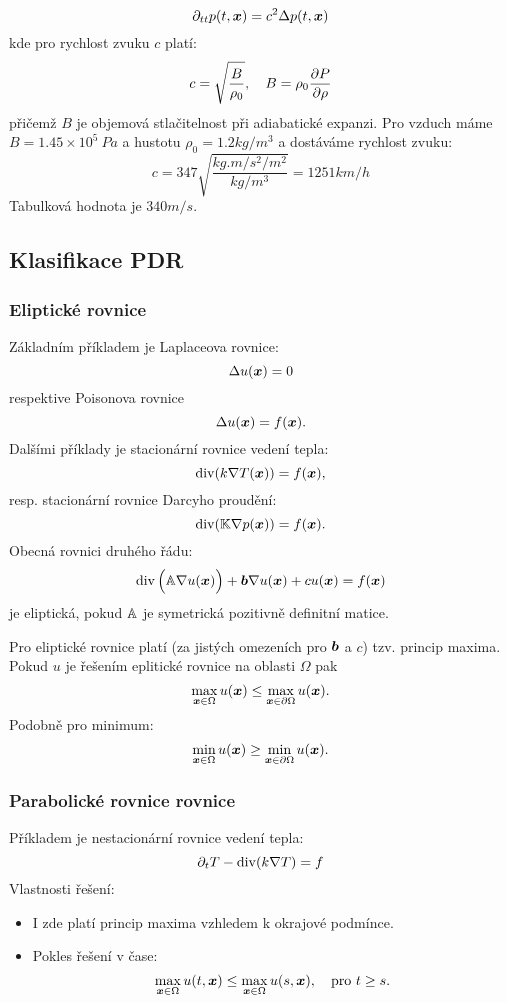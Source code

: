 \[
    \partial_{tt} p(t, \mathbf{\boldsymbol{x}}) = c^2 \Delta p(t, \mathbf{\boldsymbol{x}})
\]
kde pro rychlost zvuku $c$ platí:
\[
    c = \sqrt{\frac{B}{\rho_0}},\quad B = \rho_0 \frac{\partial P}{\partial \rho}
\]
přičemž $B$ je objemová stlačitelnost při adiabatické expanzi. Pro vzduch máme $B=1.45\times 10^5\ Pa$ a hustotu $\rho_0 = 1.2kg/m^3$ a dostáváme rychlost zvuku:
\[
    c=347 \sqrt{\frac{kg.m/s^2/m^2}{kg/m^3}} = 1251 km/h
\]
Tabulková hodnota je $340m/s$.









\subsection{Klasifikace PDR}

\subsubsection{Eliptické rovnice}
Základním příkladem je Laplaceova rovnice:
\[
    \Delta u(\mathbf{\boldsymbol{x}}) = 0
\]
respektive Poisonova rovnice
\[
    \Delta u(\mathbf{\boldsymbol{x}}) = f(\mathbf{\boldsymbol{x}}).
\]
Dalšími příklady je stacionární rovnice vedení tepla:
\[
    \operatorname{div}( k \nabla T(\mathbf{\boldsymbol{x}}) ) = f(\mathbf{\boldsymbol{x}}),
\]
resp. stacionární rovnice Darcyho proudění:
\[
    \operatorname{div}( {\mathbb{K}} \nabla p(\mathbf{\boldsymbol{x}})) = f(\mathbf{\boldsymbol{x}}).
\]
Obecná rovnici druhého řádu:
\[
  \operatorname{div}\Big( {\mathbb{A}} \nabla u(\mathbf{\boldsymbol{x}})\Big) + \mathbf{\boldsymbol{b}} \nabla u(\mathbf{\boldsymbol{x}}) + c u(\mathbf{\boldsymbol{x}})= f(\mathbf{\boldsymbol{x}})
\]
je eliptická, pokud ${\mathbb{A}}$ je symetrická pozitivně definitní matice.

Pro eliptické rovnice platí (za jistých omezeních pro $\mathbf{\boldsymbol{b}}$ a $c$) tzv. princip maxima. Pokud $u$ je řešením eplitické rovnice na oblasti $\Omega$
pak 
\[
    \max_{\mathbf{\boldsymbol{x}} \in \Omega} u(\mathbf{\boldsymbol{x}}) \le \max_{\mathbf{\boldsymbol{x}} \in \partial \Omega}  u(\mathbf{\boldsymbol{x}}).
\]
Podobně pro minimum:
\[
    \min_{\mathbf{\boldsymbol{x}} \in \Omega} u(\mathbf{\boldsymbol{x}}) \ge \min_{\mathbf{\boldsymbol{x}} \in \partial \Omega}  u(\mathbf{\boldsymbol{x}}).
\]


\subsubsection{Parabolické rovnice rovnice}
Příkladem je nestacionární rovnice vedení tepla:
\[
    \partial_t T -\operatorname{div}(k \nabla T) = f
\]
Vlastnosti řešení:
\begin{itemize}
 \item I zde platí princip maxima vzhledem k okrajové podmínce.
 \item Pokles řešení v čase:
    \[
        \max_{\mathbf{\boldsymbol{x}} \in \Omega} u(t, \mathbf{\boldsymbol{x}})   \le \max_{\mathbf{\boldsymbol{x}} \in \Omega}  u(s, \mathbf{\boldsymbol{x}}),\quad \text{pro } t\ge s.
    \]
\end{itemize}

